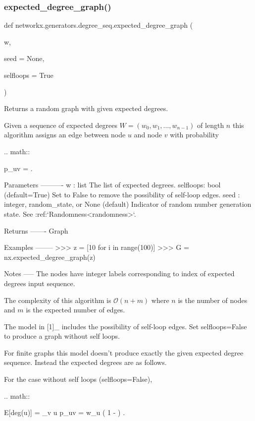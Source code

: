 \subsubsection{\texorpdfstring{expected\+\_\+degree\+\_\+graph()}{expected\_degree\_graph()}}
{\footnotesize\ttfamily def networkx.\+generators.\+degree\+\_\+seq.\+expected\+\_\+degree\+\_\+graph (\begin{DoxyParamCaption}\item[{}]{w,  }\item[{}]{seed = {\ttfamily None},  }\item[{}]{selfloops = {\ttfamily True} }\end{DoxyParamCaption})}

\begin{DoxyVerb}Returns a random graph with given expected degrees.

Given a sequence of expected degrees $W=(w_0,w_1,\ldots,w_{n-1})$
of length $n$ this algorithm assigns an edge between node $u$ and
node $v$ with probability

.. math::

   p_{uv} =  .

Parameters
----------
w : list
    The list of expected degrees.
selfloops: bool (default=True)
    Set to False to remove the possibility of self-loop edges.
seed : integer, random_state, or None (default)
    Indicator of random number generation state.
    See :ref:`Randomness<randomness>`.

Returns
-------
Graph

Examples
--------
>>> z = [10 for i in range(100)]
>>> G = nx.expected_degree_graph(z)

Notes
-----
The nodes have integer labels corresponding to index of expected degrees
input sequence.

The complexity of this algorithm is $\mathcal{O}(n+m)$ where $n$ is the
number of nodes and $m$ is the expected number of edges.

The model in [1]_ includes the possibility of self-loop edges.
Set selfloops=False to produce a graph without self loops.

For finite graphs this model doesn't produce exactly the given
expected degree sequence.  Instead the expected degrees are as
follows.

For the case without self loops (selfloops=False),

.. math::

   E[deg(u)] = \sum_{v \ne u} p_{uv}
            = w_u \left( 1 -  \right) .



\end{DoxyVerb}
